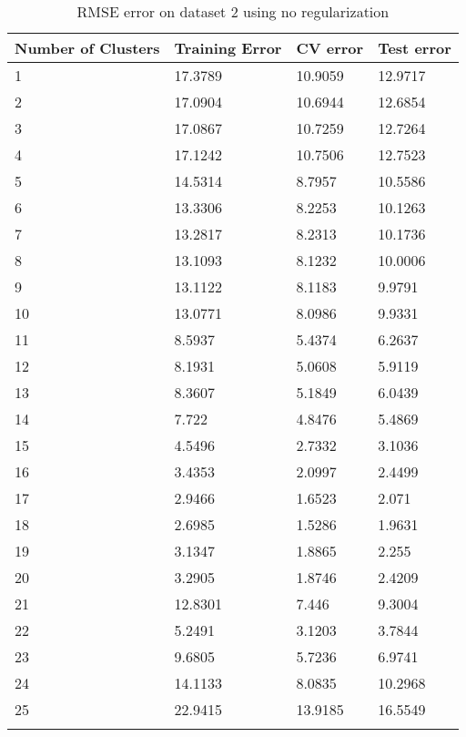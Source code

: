 \begin{center}
\begin{longtable}{l l l l}
\hline
\hline
\textbf{Number of Clusters} & \textbf{Training Error} & \textbf{CV error} & \textbf{Test error}\\
\hline
\hline
1 & 17.3789 & 10.9059 & 12.9717\\
2 & 17.0904 & 10.6944 & 12.6854\\
3 & 17.0867 & 10.7259 & 12.7264\\
4 & 17.1242 & 10.7506 & 12.7523\\
5 & 14.5314 & 8.7957 & 10.5586\\
6 & 13.3306 & 8.2253 & 10.1263\\
7 & 13.2817 & 8.2313 & 10.1736\\
8 & 13.1093 & 8.1232 & 10.0006\\
9 & 13.1122 & 8.1183 & 9.9791\\
10 & 13.0771 & 8.0986 & 9.9331\\
11 & 8.5937 & 5.4374 & 6.2637\\
12 & 8.1931 & 5.0608 & 5.9119\\
13 & 8.3607 & 5.1849 & 6.0439\\
14 & 7.722 & 4.8476 & 5.4869\\
15 & 4.5496 & 2.7332 & 3.1036\\
16 & 3.4353 & 2.0997 & 2.4499\\
17 & 2.9466 & 1.6523 & 2.071\\
18 & 2.6985 & 1.5286 & 1.9631\\
19 & 3.1347 & 1.8865 & 2.255\\
20 & 3.2905 & 1.8746 & 2.4209\\
21 & 12.8301 & 7.446 & 9.3004\\
22 & 5.2491 & 3.1203 & 3.7844\\
23 & 9.6805 & 5.7236 & 6.9741\\
24 & 14.1133 & 8.0835 & 10.2968\\
25 & 22.9415 & 13.9185 & 16.5549\\
\hline
\caption{RMSE error on dataset 2 using no regularization}
\label{table:erms_ds2_noreg_gaus}
\end{longtable}
\end{center}